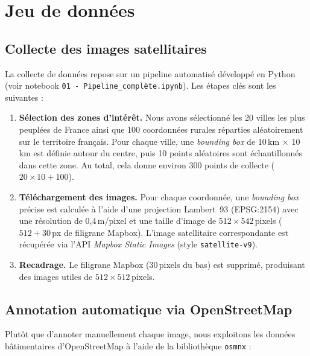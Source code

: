 \documentclass[12pt,a4paper]{article}
\begin{document}
\section{Jeu de données}\label{sec:dataset}

\subsection{Collecte des images satellitaires}

La collecte de données repose sur un pipeline automatisé développé en Python (voir notebook \texttt{01 - Pipeline\_complète.ipynb}). Les étapes clés sont les suivantes :

\begin{enumerate}
    \item \textbf{Sélection des zones d'intérêt.}
    Nous avons sélectionné les 20 villes les plus peuplées de France ainsi que 100 coordonnées rurales réparties aléatoirement sur le territoire français.
    Pour chaque ville, une \emph{bounding box} de 10\,km $\times$ 10\,km est définie autour du centre, puis 10 points aléatoires sont échantillonnés dans cette zone.
    Au total, cela donne environ 300 points de collecte ($20 \times 10 + 100$).

    \item \textbf{Téléchargement des images.}
    Pour chaque coordonnée, une \emph{bounding box} précise est calculée à l'aide d'une projection Lambert~93 (EPSG:2154) avec une résolution de 0,4\,m/pixel et une taille d'image de $512 \times 542$\,pixels ($512 + 30$\,px de filigrane Mapbox). L'image satellitaire correspondante est récupérée via l'API \emph{Mapbox Static Images} (style \texttt{satellite-v9}).

    \item \textbf{Recadrage.}
    Le filigrane Mapbox (30\,pixels du bas) est supprimé, produisant des images utiles de $512 \times 512$\,pixels.
\end{enumerate}

\subsection{Annotation automatique via OpenStreetMap}

Plutôt que d'annoter manuellement chaque image, nous exploitons les données bâtimentaires d'OpenStreetMap à l'aide de la bibliothèque \texttt{osmnx} :
\end{document}
